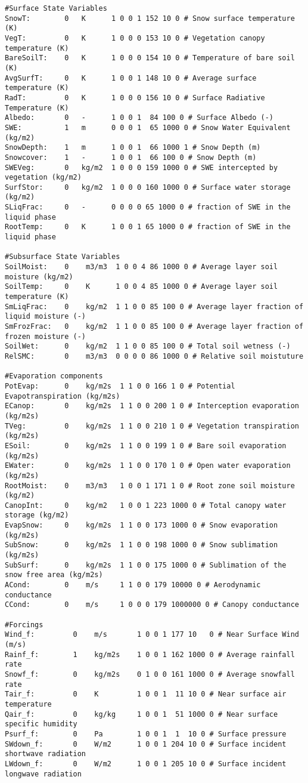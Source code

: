 \begin{verbatim}
#Surface State Variables 
SnowT:        0   K      1 0 0 1 152 10 0 # Snow surface temperature (K)
VegT:         0   K      1 0 0 0 153 10 0 # Vegetation canopy temperature (K)
BareSoilT:    0   K      1 0 0 0 154 10 0 # Temperature of bare soil (K)
AvgSurfT:     0   K      1 0 0 1 148 10 0 # Average surface temperature (K)
RadT:         0   K      1 0 0 0 156 10 0 # Surface Radiative Temperature (K)
Albedo:       0   -      1 0 0 1  84 100 0 # Surface Albedo (-)
SWE:          1   m      0 0 0 1  65 1000 0 # Snow Water Equivalent (kg/m2)
SnowDepth:    1   m      1 0 0 1  66 1000 1 # Snow Depth (m)
Snowcover:    1   -      1 0 0 1  66 100 0 # Snow Depth (m)
SWEVeg:       0   kg/m2  1 0 0 0 159 1000 0 # SWE intercepted by vegetation (kg/m2)
SurfStor:     0   kg/m2  1 0 0 0 160 1000 0 # Surface water storage (kg/m2)
SLiqFrac:     0   -      0 0 0 0 65 1000 0 # fraction of SWE in the liquid phase
RootTemp:     0   K      1 0 0 1 65 1000 0 # fraction of SWE in the liquid phase

#Subsurface State Variables
SoilMoist:    0    m3/m3  1 0 0 4 86 1000 0 # Average layer soil moisture (kg/m2)
SoilTemp:     0    K      1 0 0 4 85 1000 0 # Average layer soil temperature (K)
SmLiqFrac:    0    kg/m2  1 1 0 0 85 100 0 # Average layer fraction of liquid moisture (-)
SmFrozFrac:   0    kg/m2  1 1 0 0 85 100 0 # Average layer fraction of frozen moisture (-)
SoilWet:      0    kg/m2  1 1 0 0 85 100 0 # Total soil wetness (-)
RelSMC:       0    m3/m3  0 0 0 0 86 1000 0 # Relative soil moistuture

#Evaporation components
PotEvap:      0    kg/m2s  1 1 0 0 166 1 0 # Potential Evapotranspiration (kg/m2s)
ECanop:       0    kg/m2s  1 1 0 0 200 1 0 # Interception evaporation (kg/m2s)
TVeg:         0    kg/m2s  1 1 0 0 210 1 0 # Vegetation transpiration (kg/m2s)
ESoil:        0    kg/m2s  1 1 0 0 199 1 0 # Bare soil evaporation (kg/m2s)
EWater:       0    kg/m2s  1 1 0 0 170 1 0 # Open water evaporation (kg/m2s)
RootMoist:    0    m3/m3   1 0 0 1 171 1 0 # Root zone soil moisture (kg/m2)
CanopInt:     0    kg/m2   1 0 0 1 223 1000 0 # Total canopy water storage (kg/m2)
EvapSnow:     0    kg/m2s  1 1 0 0 173 1000 0 # Snow evaporation (kg/m2s)
SubSnow:      0    kg/m2s  1 1 0 0 198 1000 0 # Snow sublimation (kg/m2s)
SubSurf:      0    kg/m2s  1 1 0 0 175 1000 0 # Sublimation of the snow free area (kg/m2s)
ACond:        0    m/s     1 1 0 0 179 10000 0 # Aerodynamic conductance
CCond:        0    m/s     1 0 0 0 179 1000000 0 # Canopy conductance

#Forcings 
Wind_f:         0    m/s       1 0 0 1 177 10   0 # Near Surface Wind (m/s)
Rainf_f:        1    kg/m2s    1 0 0 1 162 1000 0 # Average rainfall rate 
Snowf_f:        0    kg/m2s    0 1 0 0 161 1000 0 # Average snowfall rate
Tair_f:         0    K         1 0 0 1  11 10 0 # Near surface air temperature
Qair_f:         0    kg/kg     1 0 0 1  51 1000 0 # Near surface specific humidity
Psurf_f:        0    Pa        1 0 0 1  1  10 0 # Surface pressure
SWdown_f:       0    W/m2      1 0 0 1 204 10 0 # Surface incident shortwave radiation
LWdown_f:       0    W/m2      1 0 0 1 205 10 0 # Surface incident longwave radiation


\end{verbatim}
